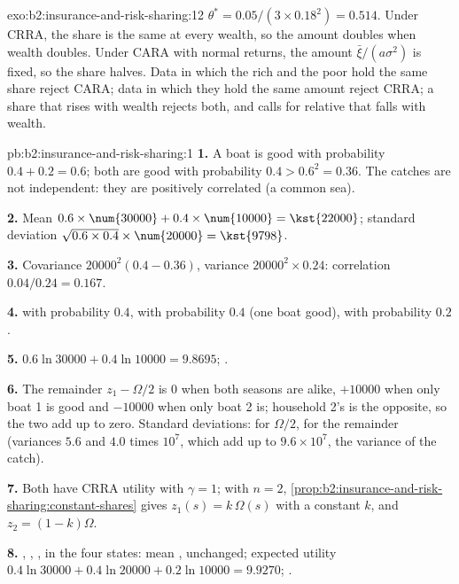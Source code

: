 \begin{solution}{exo:b2:insurance-and-risk-sharing:12}
$\theta^{*} = 0.05/(3 \times 0.18^2) = 0.514$. Under CRRA, the share is the same at every wealth, so
the amount doubles when wealth doubles. Under CARA with normal returns, the amount $\bar\xi/(a\sigma^2)$
is fixed, so the share halves. Data in which the rich and the poor hold the same share reject CARA;
data in which they hold the same amount reject CRRA; a share that rises with wealth rejects both, and
calls for relative  that falls with wealth.
\end{solution}

\begin{solution}{pb:b2:insurance-and-risk-sharing:1}
\textbf{1.} A boat is good with probability $0.4 + 0.2 = 0.6$; both are good with probability $0.4 >
0.6^2 = 0.36$. The catches are not independent: they are positively correlated (a common sea).

\textbf{2.} Mean $0.6 \times \num{30000} + 0.4 \times \num{10000} = \kst{22000}$; standard deviation
$\sqrt{0.6 \times 0.4} \times \num{20000} = \kst{9798}$.

\textbf{3.} Covariance $\num{20000}^2(0.4 - 0.36)$, variance $\num{20000}^2 \times 0.24$: correlation
$0.04/0.24 = 0.167$.

\textbf{4.}  with probability $0.4$,  with probability $0.4$ (one boat good),
 with probability $0.2$.

\textbf{5.} $0.6\ln\num{30000} + 0.4\ln\num{10000} = 9.8695$;  .

\textbf{6.} The remainder $z_1 - \Omega/2$ is $0$ when both seasons are alike, $+\num{10000}$ when only
boat 1 is good and $-\num{10000}$ when only boat 2 is; household 2's is the opposite, so the two add up
to zero. Standard deviations:  for $\Omega/2$,  for the remainder (variances
$5.6$ and $4.0$ times $10^7$, which add up to $9.6 \times 10^7$, the variance of the catch).

\textbf{7.} Both have CRRA utility with $\gamma = 1$; with $n = 2$,
\cref{prop:b2:insurance-and-risk-sharing:constant-shares} gives $z_1(s) = k\,\Omega(s)$ with a constant
$k$, and $z_2 = (1 - k)\Omega$.

\textbf{8.} , , ,  in the four states: mean ,
unchanged; expected utility $0.4\ln\num{30000} + 0.4\ln\num{20000} + 0.2\ln\num{10000} = 9.9270$;
 .


\end{solution}
